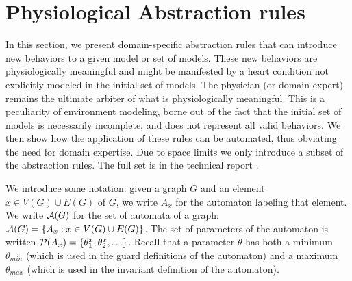 \section{Physiological Abstraction rules}
\label{abstractionRules} 
In this section, we present domain-specific abstraction rules that can introduce new behaviors to a given model or set of models. 
These new behaviors are physiologically meaningful and might be manifested by a heart condition not explicitly modeled in the initial set of models.
The physician (or domain expert) remains the ultimate arbiter of what is physiologically meaningful.
This is a peculiarity of environment modeling, borne out of the fact that the initial set of models is necessarily incomplete, and does not represent all valid behaviors.
We then show how the application of these rules can be automated, thus obviating the need for domain expertise.
Due to space limits we only introduce a subset of the abstraction rules. 
The full set is in the technical report \cite{regar_tech}.

We introduce some notation: given a graph $G$ and an element $x \in V(G) \cup E(G)$ of $G$, we write $A_x$ for the automaton labeling that element.
We write $\mathcal{A}(G)$ for the set of automata of a graph: $\mathcal{A}(G) = \{A_x : x \in V(G) \cup E(G)\}$.
The set of parameters of the automaton is written $\mathcal{P}(A_x) = \{\theta_1^x,\theta_2^x,\ldots\}$. 
Recall that a parameter $\theta$ has both a minimum $\theta_{min}$ (which is used in the guard definitions of the automaton) and a maximum $\theta_{max}$ (which is used in the invariant definition of the automaton).

%
%

